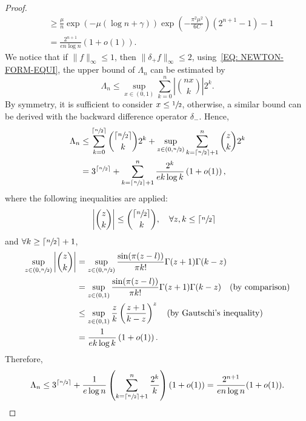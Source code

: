 \begin{proof}
\begin{equation}
\begin{aligned}
        & \ge \frac{\mu}{n} \exp(-\mu (\log n + \gamma))\exp\left(-\frac{\pi^2\mu^2}{6C}\right)(2^{n+1} - 1) - 1 \\
        & =\frac{2^{n+1}}{e n \log n} \left(1 + o(1)\right).
    \end{aligned}
    \end{equation}
    We notice that if $\|f\|_{\infty}\le 1$,  then $\|\delta_{+} f\|_{\infty}\le 2$, using~\eqref{EQ: NEWTON-FORM-EQUI}, the upper bound of $\Lambda_n$ can be estimated by
    \begin{equation}
        \Lambda_n \le \sup_{x\in (0, 1)}\sum_{k=0}^n \left|\binom{nx}{k}\right| 2^k.
    \end{equation}
    By symmetry, it is sufficient to consider $x\le \sfrac{1}{2}$, otherwise, a similar bound can be derived with the backward difference operator $\delta_{-}$. Hence, 
    \begin{equation}
    \begin{aligned}
        \Lambda_n &\le \sum_{k=0}^{\lceil \sfrac{n}{2} \rceil} \binom{\lceil \sfrac{n}{2} \rceil}{k} 2^k + \sup_{z\in (0, \sfrac{n}{2})}  \sum_{k=\lceil \sfrac{n}{2} \rceil + 1}^{n} \binom{z}{k} 2^k \\
        &= 3^{ \lceil \sfrac{n}{2} \rceil } + \sum_{k = \lceil\sfrac{n}{2} \rceil + 1}^n  \frac{2^k}{e k \log k}\left(1 + o(1)\right),
    \end{aligned}
    \end{equation}
    where the following inequalities are applied:  
    \begin{equation}
        \begin{aligned}
            &\left|\binom{z}{k}\right|\le \binom{\lceil \sfrac{n}{2} \rceil}{k},\quad \forall z,k\le \lceil \sfrac{n}{2} \rceil
        \end{aligned}
    \end{equation} 
    and $\forall k \ge \lceil\sfrac{n}{2} \rceil + 1$, 
    \begin{equation}
        \begin{aligned}
            \sup_{z\in (0, \sfrac{n}{2})}\left|\binom{z}{k}\right| &=  \sup_{z\in (0, \sfrac{n}{2})} \frac{\sin(\pi(z - l))}{\pi k!} \Gamma(z+1)\Gamma(k - z) \\
            &=\sup_{z\in (0, 1)} \frac{\sin(\pi(z - l))}{\pi k!} \Gamma(z+1)\Gamma(k - z) \quad (\text{by comparison})\\&\le \sup_{z\in (0, 1)}\frac{z}{k}\left(\frac{z+1}{k - z}\right)^z \quad (\text{by Gautschi's inequality})\\
            &= \frac{1}{e k \log k}\left(1 + o(1)\right).
        \end{aligned}
    \end{equation}
    Therefore,  
    \begin{equation}
        \Lambda_n \le 3^{\lceil \sfrac{n}{2}\rceil}+  \frac{1}{e \log n} \left( \sum_{k=\lceil \sfrac{n}{2}\rceil+1}^n \frac{2^k}{k}\right) (1 + o(1)) =  \frac{2^{n+1}}{e n \log n}  (1 + o(1)).
    \end{equation}
\end{proof}
